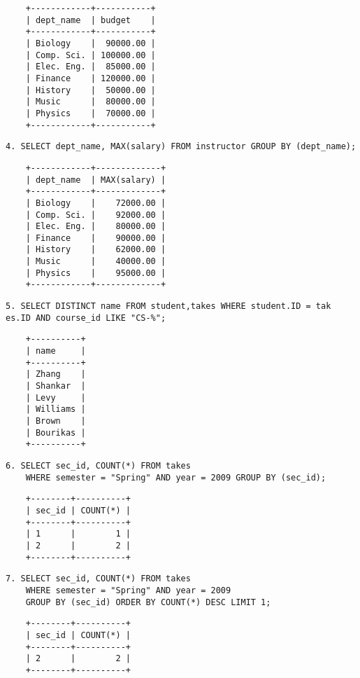 \documentclass{article}
\begin{document}
\begin{lstlisting}
    +------------+-----------+
    | dept_name  | budget    |
    +------------+-----------+
    | Biology    |  90000.00 |
    | Comp. Sci. | 100000.00 |
    | Elec. Eng. |  85000.00 |
    | Finance    | 120000.00 |
    | History    |  50000.00 |
    | Music      |  80000.00 |
    | Physics    |  70000.00 |
    +------------+-----------+
\end{lstlisting}

\pagebreak

\begin{lstlisting}
4. SELECT dept_name, MAX(salary) FROM instructor GROUP BY (dept_name);
\end{lstlisting}
\begin{lstlisting}
    +------------+-------------+
    | dept_name  | MAX(salary) |
    +------------+-------------+
    | Biology    |    72000.00 |
    | Comp. Sci. |    92000.00 |
    | Elec. Eng. |    80000.00 |
    | Finance    |    90000.00 |
    | History    |    62000.00 |
    | Music      |    40000.00 |
    | Physics    |    95000.00 |
    +------------+-------------+
\end{lstlisting}
\begin{lstlisting}
5. SELECT DISTINCT name FROM student,takes WHERE student.ID = tak
es.ID AND course_id LIKE "CS-%";
\end{lstlisting}
\begin{lstlisting}
    +----------+
    | name     |
    +----------+
    | Zhang    |
    | Shankar  |
    | Levy     |
    | Williams |
    | Brown    |
    | Bourikas |
    +----------+
\end{lstlisting}
\begin{lstlisting}
6. SELECT sec_id, COUNT(*) FROM takes   
    WHERE semester = "Spring" AND year = 2009 GROUP BY (sec_id);
\end{lstlisting}
\begin{lstlisting}
    +--------+----------+
    | sec_id | COUNT(*) |
    +--------+----------+
    | 1      |        1 |
    | 2      |        2 |
    +--------+----------+
\end{lstlisting}
\begin{lstlisting}
7. SELECT sec_id, COUNT(*) FROM takes 
    WHERE semester = "Spring" AND year = 2009
    GROUP BY (sec_id) ORDER BY COUNT(*) DESC LIMIT 1;
\end{lstlisting}
\begin{lstlisting}
    +--------+----------+
    | sec_id | COUNT(*) |
    +--------+----------+
    | 2      |        2 |
    +--------+----------+
\end{lstlisting}
\end{document}
